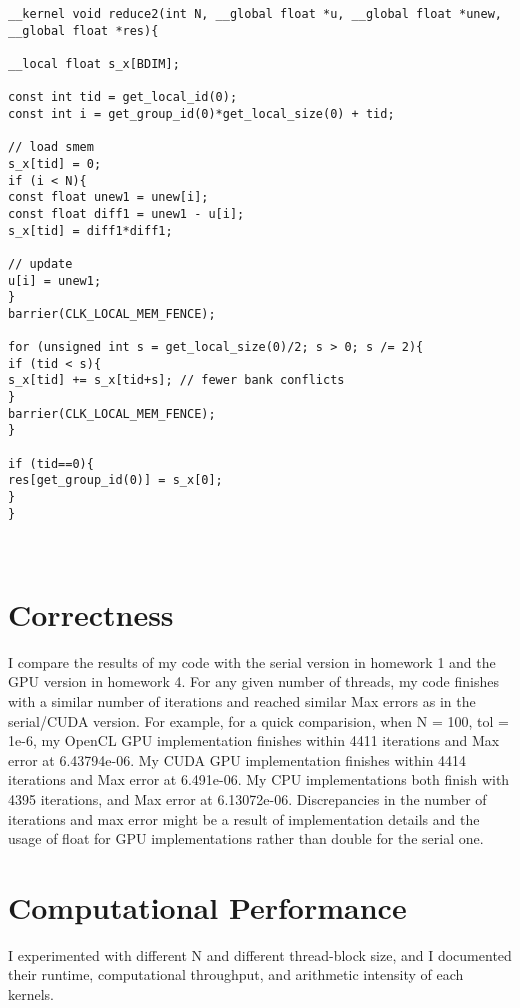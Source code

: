 \documentclass{amsart} %
\begin{document}
\begin{lstlisting}
__kernel void reduce2(int N, __global float *u, __global float *unew, __global float *res){

__local float s_x[BDIM];

const int tid = get_local_id(0);
const int i = get_group_id(0)*get_local_size(0) + tid;

// load smem
s_x[tid] = 0;
if (i < N){
const float unew1 = unew[i];
const float diff1 = unew1 - u[i];
s_x[tid] = diff1*diff1;

// update
u[i] = unew1;
}
barrier(CLK_LOCAL_MEM_FENCE);

for (unsigned int s = get_local_size(0)/2; s > 0; s /= 2){
if (tid < s){
s_x[tid] += s_x[tid+s]; // fewer bank conflicts
}
barrier(CLK_LOCAL_MEM_FENCE);
}   

if (tid==0){
res[get_group_id(0)] = s_x[0];
}
}

	
\end{lstlisting}



\section{Correctness}

I compare the results of my code with the serial version in homework 1 and the GPU version in homework 4. For any given number of threads, my code finishes with a similar number of iterations and reached similar Max errors as in the serial/CUDA version. For example, for a quick comparision, when N = 100, tol = 1e-6, my OpenCL GPU implementation finishes within 4411 iterations and Max error at 6.43794e-06. My CUDA GPU implementation finishes within 4414 iterations and Max error at 6.491e-06. My CPU implementations both finish with 4395 iterations, and Max error at 6.13072e-06. Discrepancies in the number of iterations and max error might be a result of implementation details and the usage of float for GPU implementations rather than double for the serial one.    



\section{Computational Performance}
I experimented with different N and different thread-block size, and I documented their runtime, computational throughput, and arithmetic intensity of each kernels.
\end{document}
